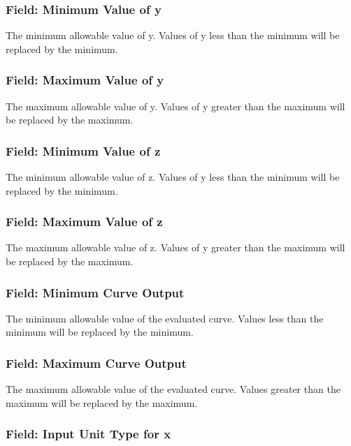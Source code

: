 \subsubsection{Field: Minimum Value of y}\label{field-minimum-value-of-y-4}

The minimum allowable value of y. Values of y less than the minimum will be replaced by the minimum.

\subsubsection{Field: Maximum Value of y}\label{field-maximum-value-of-y-4}

The maximum allowable value of y. Values of y greater than the maximum will be replaced by the maximum.

\subsubsection{Field: Minimum Value of z}\label{field-minimum-value-of-z-1}

The minimum allowable value of z. Values of y less than the minimum will be replaced by the minimum.

\subsubsection{Field: Maximum Value of z}\label{field-maximum-value-of-z-1}

The maximum allowable value of z. Values of y greater than the maximum will be replaced by the maximum.

\subsubsection{Field: Minimum Curve Output}\label{field-minimum-curve-output-8}

The minimum allowable value of the evaluated curve. Values less than the minimum will be replaced by the minimum.

\subsubsection{Field: Maximum Curve Output}\label{field-maximum-curve-output-7}

The maximum allowable value of the evaluated curve. Values greater than the maximum will be replaced by the maximum.

\subsubsection{Field: Input Unit Type for x}\label{field-input-unit-type-for-x-9}

